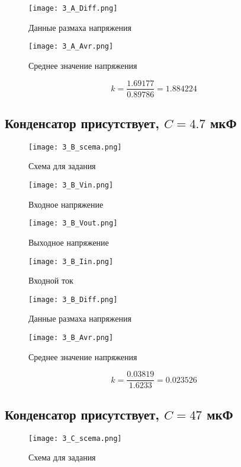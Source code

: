 \documentclass[a4paper,14pt]{article}
\begin{document}
\begin{figure}[H]
	\centering
	\texttt{[image: 3\_A\_Diff.png]}
	\caption{Данные размаха напряжения}	
\end{figure}

\begin{figure}[H]
	\centering
	\texttt{[image: 3\_A\_Avr.png]}
	\caption{Среднее значение напряжения}	
\end{figure}

$$k = \frac{1.69177}{0.89786} = 1.884224$$

\subsection{Конденсатор присутствует, $C = 4.7$ мкФ}
\begin{figure}[H]
	\centering
	\texttt{[image: 3\_B\_scema.png]}
	\caption{Схема для задания}	
\end{figure}

\begin{figure}[H]
	\centering
	\texttt{[image: 3\_B\_Vin.png]}
	\caption{Входное напряжение}	
\end{figure}

\begin{figure}[H]
	\centering
	\texttt{[image: 3\_B\_Vout.png]}
	\caption{Выходное напряжение}	
\end{figure}

\begin{figure}[H]
	\centering
	\texttt{[image: 3\_B\_Iin.png]}
	\caption{Входной ток}	
\end{figure}

\begin{figure}[H]
	\centering
	\texttt{[image: 3\_B\_Diff.png]}
	\caption{Данные размаха напряжения}	
\end{figure}

\begin{figure}[H]
	\centering
	\texttt{[image: 3\_B\_Avr.png]}
	\caption{Среднее значение напряжения}	
\end{figure}

$$k = \frac{0.03819}{1.6233} = 0.023526$$

\subsection{Конденсатор присутствует, $C = 47$ мкФ}
\begin{figure}[H]
	\centering
	\texttt{[image: 3\_C\_scema.png]}
	\caption{Схема для задания}	
\end{figure}
\end{document}
